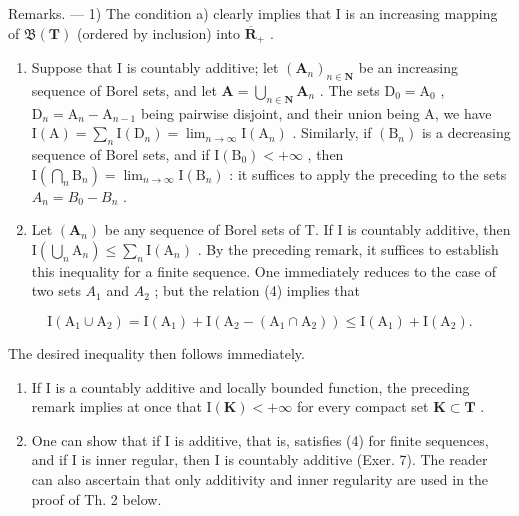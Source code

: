 Remarks. --- 1) The condition a) clearly implies that I is an increasing mapping of \(\mathfrak{B}(\mathbf{T})\) (ordered by inclusion) into \(\overline{\mathbf{R}}_{+}\) .

\begin{enumerate}
\def\labelenumi{\arabic{enumi})}
\setcounter{enumi}{1}
\item
  Suppose that I is countably additive; let \((\mathbf{A}_n)_{n\in \mathbf{N}}\) be an increasing sequence of Borel sets, and let \(\mathbf{A} = \bigcup_{n\in \mathbf{N}}\mathbf{A}_n\) . The sets \(\mathrm{D}_0 = \mathrm{A}_0\) , \(\mathrm{D}_n = \mathrm{A}_n - \mathrm{A}_{n - 1}\) being pairwise disjoint, and their union being A, we have \(\mathrm{I}(\mathrm{A}) = \sum_{n} \mathrm{I}(\mathrm{D}_{n}) = \lim_{n \to \infty} \mathrm{I}(\mathrm{A}_{n})\) . Similarly, if \((\mathrm{B}_{n})\) is a decreasing sequence of Borel sets, and if \(\mathrm{I}(\mathrm{B}_{0}) < +\infty\) , then \(\mathrm{I}\left(\bigcap_{n} \mathrm{B}_{n}\right) = \lim_{n \to \infty} \mathrm{I}(\mathrm{B}_{n})\) : it suffices to apply the preceding to the sets \(A_{n} = B_{0} - B_{n}\) .
\item
  Let \((\mathbf{A}_n)\) be any sequence of Borel sets of T. If I is countably additive, then \(\mathrm{I}\left(\bigcup_{n} \mathrm{A}_n\right) \leqslant \sum_{n} \mathrm{I}(\mathrm{A}_n)\) . By the preceding remark, it suffices to establish this inequality for a finite sequence. One immediately reduces to the case of two sets \(A_{1}\) and \(A_{2}\) ; but the relation (4) implies that
\end{enumerate}

\[
\mathrm{I} \left(\mathrm{A} _ {1} \cup \mathrm{A} _ {2}\right) = \mathrm{I} \left(\mathrm{A} _ {1}\right) + \mathrm{I} \left(\mathrm{A} _ {2} - \left(\mathrm{A} _ {1} \cap \mathrm{A} _ {2}\right)\right) \leqslant \mathrm{I} \left(\mathrm{A} _ {1}\right) + \mathrm{I} \left(\mathrm{A} _ {2}\right).
\]

The desired inequality then follows immediately.

\begin{enumerate}
\def\labelenumi{\arabic{enumi})}
\setcounter{enumi}{3}
\item
  If I is a countably additive and locally bounded function, the preceding remark implies at once that \(\mathrm{I}(\mathbf{K}) < +\infty\) for every compact set \(\mathbf{K} \subset \mathbf{T}\) .
\item
  One can show that if I is additive, that is, satisfies (4) for finite sequences, and if I is inner regular, then I is countably additive (Exer. 7). The reader can also ascertain that only additivity and inner regularity are used in the proof of Th. 2 below.
\end{enumerate}

